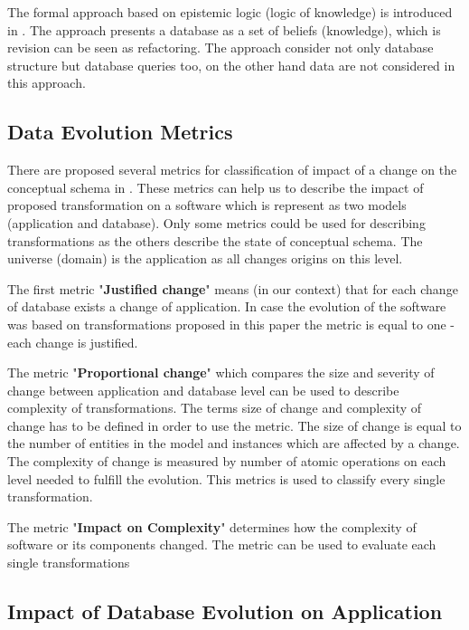 \documentclass[11pt]{article}
\begin{document}
The formal approach based on epistemic logic (logic of knowledge) is introduced in \cite{Chang-LogicFrameworkForDbRefactoring}. The approach presents a database as a set of beliefs (knowledge), which is revision can be seen as refactoring. The approach consider not only database structure but database queries too, on the other hand data are not considered in this approach.

\subsection{Data Evolution Metrics}
There are proposed several metrics for classification of impact of a change on the conceptual schema in \cite{Wedemeijer:ConceptualMetrics}. These metrics can help us to describe the impact of proposed transformation on a software which is represent as two models (application and database). Only some metrics could be used for describing transformations as the others describe the state of conceptual schema. The universe (domain) is the application as all changes origins on this level.

The first metric "\textbf{Justified change}" means (in our context) that for each change of database exists a change of application. In case the evolution of the software was based on transformations proposed in this paper the metric is equal to one - each change is justified.

The metric "\textbf{Proportional change}" which compares the size and severity of change between application and database level can be used to describe complexity of transformations. The terms size of change and complexity of change has to be defined in order to use the metric. The size of change is equal to the number of entities in the model and instances which are affected by a change. The complexity of change is measured by number of atomic operations on each level needed to fulfill the evolution. This metrics is used to classify every single transformation.

The metric "\textbf{Impact on Complexity}" determines how the complexity of software or its components  changed. The metric can be used to evaluate each single transformations

\subsection{Impact of Database Evolution on Application}
\end{document}
